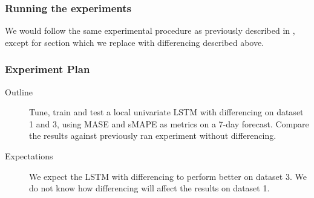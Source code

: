 \subsubsection{Running the experiments}
We would follow the same experimental procedure as previously described in ,
except for section  which we replace with differencing described above.


\subsubsection{Experiment Plan}
\begin{description}
  \item[Outline]{
              Tune, train and test a local univariate LSTM with differencing
              on dataset 1 and 3,
              using MASE and sMAPE as metrics on a 7-day forecast.
              Compare the results against previously ran experiment without differencing.
        }
\end{description}

\begin{description}
  \item[Expectations]{
              We expect the LSTM with differencing to perform better on dataset 3.
              We do not know how differencing will affect the results on dataset 1.
        }
\end{description}


